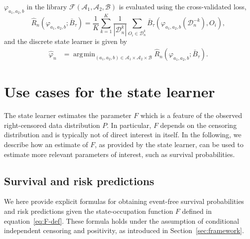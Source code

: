 \documentclass[a4paper,danish]{article}
\theoremstyle{plain} %
\numberwithin{theorem}{section}
\theoremstyle{definition} %
\theoremstyle{remark}
\renewcommand{\phi}{\varphi}
\newcommand{\1}{\mathds{1}}
\DeclareMathOperator*{\argmin}{\arg\!\min}
\newcommand{\data}{\ensuremath{\mathcal{D}}}
\begin{document}
\( \phi_{a_1, a_2, b} \) in the library
\( \mathcal{F}(\mathcal{A}_1, \mathcal{A}_2, \mathcal{B}) \)
is evaluated using the cross-validated loss,
\begin{equation*}
  \hat{R}_{n}(\phi_{a_1,a_2,b} ; \bar{B}_{\tau}) =
  \frac{1}{K}\sum_{k=1}^{K}
  \frac{1}{| \data_n^{k} |}\sum_{O_i \in \data_n^{k}}
  \bar B_\tau
  {
    \left(
      \phi_{a_1,a_2,b}{ (\data_n^{-k})}
      , O_i
    \right)
  },
\end{equation*}
and the discrete state learner is given by
\begin{align*}\label{eq:discrete-state-learner}
  \hat{\phi}_n
  &=  \argmin_{(a_1,a_2,b)\in \mathcal{A}_1\times\mathcal{A}_2\times\mathcal{B}}
    \hat{R}_{n}(\phi_{a_1,a_2,b} ; \bar{B}_{\tau}).
\end{align*}


\section{Use cases for the state learner}
\label{sec:use-cases-state}

The state learner estimates the parameter \( F \) which is a
feature of the observed right-censored data distribution
\( P \). In particular, \( F \) depends on the censoring
distribution and is typically not of direct interest in
itself. In the following, we describe how an estimate of
\( F \), as provided by the state learner, can be used to
estimate more relevant parameters of interest, such as
survival probabilities.

\subsection{Survival and risk predictions}
\label{sec:surv-risk-pred}

We here provide explicit formulas for obtaining event-free
survival probabilities and risk predictions given the
state-occupation function \( F \) defined in
equation~\eqref{eq:F-def}. These formula holds under the
assumption of conditional independent censoring and
positivity, as introduced in Section~\ref{sec:framework}.
\end{document}
